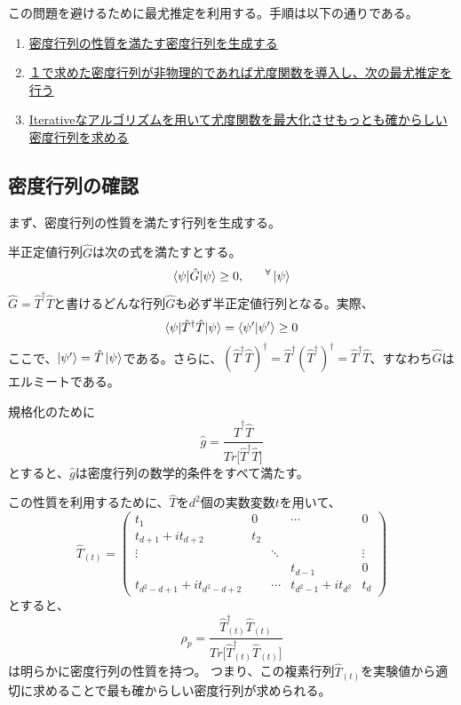 \documentclass[11pt,a4j,notitlepage]{jreport}
\begin{document}
	この問題を避けるために最尤推定を利用する。手順は以下の通りである。

	\begin{enumerate}
		\item \underline{密度行列の性質を満たす密度行列を生成する}
		\item \underline{１で求めた密度行列が非物理的であれば尤度関数を導入し、次の最尤推定を行う}
		\item \underline{Iterativeなアルゴリズムを用いて尤度関数を最大化させもっとも確からしい密度行列を求める}
	\end{enumerate}


	\subsection{密度行列の確認}

	まず、密度行列の性質を満たす行列を生成する。

	半正定値行列$\hat{G}$は次の式を満たすとする。
	\begin{equation}
		\braket{\psi | \hat{G} | \psi} \geq 0,\ \ \ \ \ ^\forall \ket{\psi}
	\end{equation}
	$\hat{G} = \hat{T}^\dagger \hat{T}$と書けるどんな行列$\hat{G}$も必ず半正定値行列となる。実際、
	\begin{equation}
		\braket{\psi | \hat{T}^\dagger \hat{T} | \psi} = \braket{\psi' | \psi'} \geq 0
	\end{equation}
	ここで、$\ket{\psi'} = \hat{T} \ket{\psi}$である。さらに、$(\hat{T}^\dagger \hat{T})^\dagger = \hat{T}^\dagger (\hat{T}^\dagger)^\dagger = \hat{T}^\dagger \hat{T}$、すなわち$\hat{G}$はエルミートである。

	規格化のために
	\begin{equation}
		\hat{g} = \frac{\hat{T}^\dagger \hat{T}}{Tr \big[ \hat{T}^\dagger \hat{T} \big] } 
	\end{equation}
	とすると、$\hat{g}$は密度行列の数学的条件をすべて満たす。

	この性質を利用するために、$\hat{T}$を$d^2$個の実数変数$t$を用いて、
	\begin{equation}
		\hat{T}_{(t)} = \begin{pmatrix}
			t_1 & 0 & & \cdots & 0 \\
			t_{d+1} + it_{d+2} & t_2 & & & \\
			\vdots & & \ddots &  & \vdots \\
			& & & t_{d-1} & 0 \\
			t_{d^2 - d + 1} + it_{d^2 - d + 2} & & \cdots & t_{d^2 - 1} + it_{d^2} & t_d
		\end{pmatrix}
	\end{equation}
	とすると、
	\begin{equation}
		\hat{\rho}_p = \frac{\hat{T}^\dagger_{(t)} \hat{T}_{(t)}}{Tr \big[ \hat{T}^\dagger_{(t)} \hat{T}_{(t)} \big] }
	\end{equation}
	は明らかに密度行列の性質を持つ。
	つまり、この複素行列$\hat{T}_{(t)}$を実験値から適切に求めることで最も確からしい密度行列が求められる。
\end{document}

